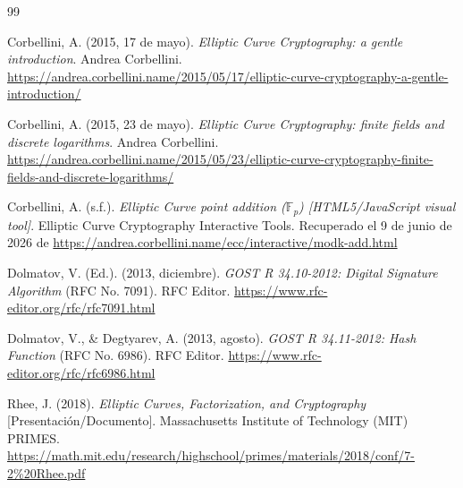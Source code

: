 \begin{thebibliography}{99}
\setlength{\itemindent}{-2.5em}
\setlength{\leftmargin}{2.5em}

Corbellini, A. (2015, 17 de mayo). \textit{Elliptic Curve Cryptography: a gentle introduction}. Andrea Corbellini. \url{https://andrea.corbellini.name/2015/05/17/elliptic-curve-cryptography-a-gentle-introduction/}

Corbellini, A. (2015, 23 de mayo). \textit{Elliptic Curve Cryptography: finite fields and discrete logarithms}. Andrea Corbellini. \url{https://andrea.corbellini.name/2015/05/23/elliptic-curve-cryptography-finite-fields-and-discrete-logarithms/}

Corbellini, A. (s.f.). \textit{Elliptic Curve point addition ($\mathbb{F}_p$) [HTML5/JavaScript visual tool]}. Elliptic Curve Cryptography Interactive Tools. Recuperado el 9 de junio de 2026 de \url{https://andrea.corbellini.name/ecc/interactive/modk-add.html}

Dolmatov, V. (Ed.). (2013, diciembre). \textit{GOST R 34.10-2012: Digital Signature Algorithm} (RFC No. 7091). RFC Editor. \url{https://www.rfc-editor.org/rfc/rfc7091.html}

Dolmatov, V., \& Degtyarev, A. (2013, agosto). \textit{GOST R 34.11-2012: Hash Function} (RFC No. 6986). RFC Editor. \url{https://www.rfc-editor.org/rfc/rfc6986.html}

Rhee, J. (2018). \textit{Elliptic Curves, Factorization, and Cryptography} [Presentación/Documento]. Massachusetts Institute of Technology (MIT) PRIMES. \url{https://math.mit.edu/research/highschool/primes/materials/2018/conf/7-2%20Rhee.pdf}

\end{thebibliography}